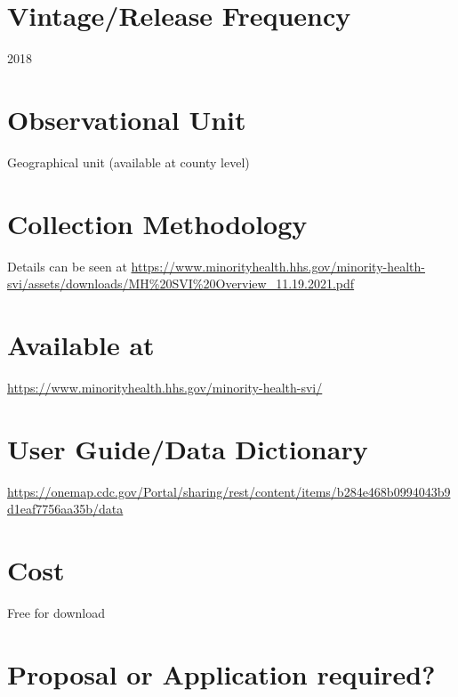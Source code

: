 \documentclass[
]{book}
\begin{document}
\hypertarget{vintagerelease-frequency-41}{%
\section{Vintage/Release Frequency}\label{vintagerelease-frequency-41}}

2018

\hypertarget{observational-unit-41}{%
\section{Observational Unit}\label{observational-unit-41}}

Geographical unit (available at county level)

\hypertarget{collection-methodology-41}{%
\section{Collection Methodology}\label{collection-methodology-41}}

Details can be seen at \url{https://www.minorityhealth.hhs.gov/minority-health-svi/assets/downloads/MH\%20SVI\%20Overview_11.19.2021.pdf}

\hypertarget{available-at-41}{%
\section{Available at}\label{available-at-41}}

\url{https://www.minorityhealth.hhs.gov/minority-health-svi/}

\hypertarget{user-guidedata-dictionary-41}{%
\section{User Guide/Data Dictionary}\label{user-guidedata-dictionary-41}}

\url{https://onemap.cdc.gov/Portal/sharing/rest/content/items/b284e468b0994043b9d1eaf7756aa35b/data}

\hypertarget{cost-41}{%
\section{Cost}\label{cost-41}}

Free for download

\hypertarget{proposal-or-application-required-41}{%
\section{Proposal or Application required?}\label{proposal-or-application-required-41}}
\end{document}
